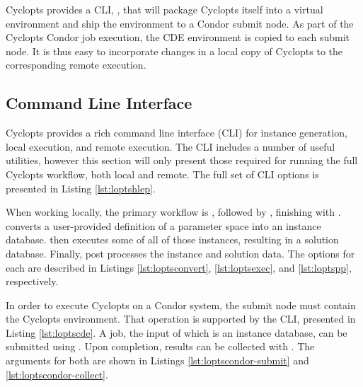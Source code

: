 Cyclopts provides a CLI, , that will package Cyclopts itself
into a virtual environment and ship the environment to a Condor submit node. As
part of the Cyclopts Condor job execution, the CDE environment is copied to each
submit node. It is thus easy to incorporate changes in a local copy of Cyclopts
to the corresponding remote execution.

\subsection{Command Line Interface}\label{method:tools:cli}

Cyclopts provides a rich command line interface (CLI) for instance generation,
local execution, and remote execution. The CLI includes a number of useful
utilities, however this section will only present those required for running the
full Cyclopts workflow, both local and remote. The full set of CLI options is
presented in Listing \ref{lst:loptshlep}.



When working locally, the primary workflow is , followed
by , finishing with .  converts a user-provided definition of a parameter space into an
instance database.  then executes some of all of those
instances, resulting in a solution database. Finally,  post
processes the instance and solution data. The options for each are described in
Listings \ref{lst:loptsconvert}, \ref{lst:loptsexec}, and \ref{lst:loptspp},
respectively.







In order to execute Cyclopts on a Condor system, the submit node must contain
the Cyclopts environment. That operation is supported by the 
CLI, presented in Listing \ref{lst:loptscde}. A job, the input of which is an
instance database, can be submitted using . Upon
completion, results can be collected with . The
arguments for both are shown in Listings \ref{lst:loptscondor-submit} and
\ref{lst:loptscondor-collect}.

